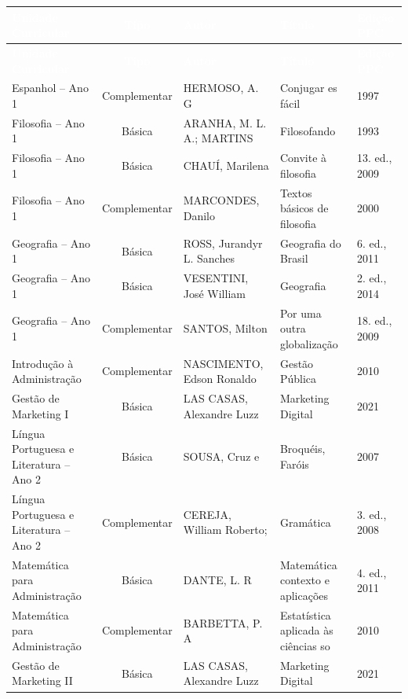 \documentclass[10pt,a4paper]{article}
\begin{document}
\vspace{0.2cm}
\begin{xltabular}{\linewidth}{|p{3.6cm}|c|p{3.0cm}|X|p{2.4cm}|}
\hline
{}
\textcolor{white}{\textbf{Unidade Curricular}} & \textcolor{white}{\textbf{Tipo}} & \textcolor{white}{\textbf{Autor}} & \textcolor{white}{\textbf{Título}} & \textcolor{white}{\textbf{Edição PPC}} \\ \hline
\endfirsthead
\hline
{}
\textcolor{white}{\textbf{Unidade Curricular}} & \textcolor{white}{\textbf{Tipo}} & \textcolor{white}{\textbf{Autor}} & \textcolor{white}{\textbf{Título}} & \textcolor{white}{\textbf{Edição PPC}} \\ \hline
\endhead
Espanhol -- Ano 1 & Complementar & HERMOSO, A. G & Conjugar es fácil & 1997 \\ \hline
Filosofia -- Ano 1 & Básica & ARANHA, M. L. A.; MARTINS & Filosofando & 1993 \\ \hline
Filosofia -- Ano 1 & Básica & CHAUÍ, Marilena & Convite à filosofia & 13. ed., 2009 \\ \hline
Filosofia -- Ano 1 & Complementar & MARCONDES, Danilo & Textos básicos de filosofia & 2000 \\ \hline
Geografia -- Ano 1 & Básica & ROSS, Jurandyr L. Sanches & Geografia do Brasil & 6. ed., 2011 \\ \hline
Geografia -- Ano 1 & Básica & VESENTINI, José William & Geografia & 2. ed., 2014 \\ \hline
Geografia -- Ano 1 & Complementar & SANTOS, Milton & Por uma outra globalização & 18. ed., 2009 \\ \hline
Introdução à Administração & Complementar & NASCIMENTO, Edson Ronaldo & Gestão Pública & 2010 \\ \hline
Gestão de Marketing I & Básica & LAS CASAS, Alexandre Luzz & Marketing Digital & 2021 \\ \hline
Língua Portuguesa e Literatura -- Ano 2 & Básica & SOUSA, Cruz e & Broquéis, Faróis & 2007 \\ \hline
Língua Portuguesa e Literatura -- Ano 2 & Complementar & CEREJA, William Roberto; & Gramática & 3. ed., 2008 \\ \hline
Matemática para Administração & Básica & DANTE, L. R & Matemática contexto e aplicações & 4. ed., 2011 \\ \hline
Matemática para Administração & Complementar & BARBETTA, P. A & Estatística aplicada às ciências so & 2010 \\ \hline
Gestão de Marketing II & Básica & LAS CASAS, Alexandre Luzz & Marketing Digital & 2021 \\ \hline

\end{xltabular}
\end{document}
